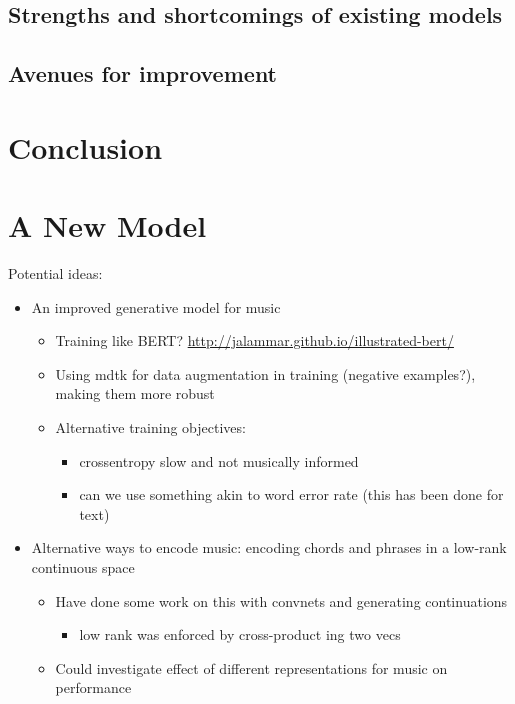 \documentclass[12pt,a4paper,]{report}
\providecommand{\tightlist}{%
  \setlength{\itemsep}{0pt}\setlength{\parskip}{0pt}}
\begin{document}
\hypertarget{strengths-and-shortcomings-of-existing-models}{%
\section{Strengths and shortcomings of existing
models}\label{strengths-and-shortcomings-of-existing-models}}

\hypertarget{avenues-for-improvement}{%
\section{Avenues for improvement}\label{avenues-for-improvement}}

\hypertarget{conclusion}{%
\chapter{Conclusion}\label{conclusion}}

\hypertarget{a-new-model}{%
\chapter{A New Model}\label{a-new-model}}

Potential ideas:

\begin{itemize}
\tightlist
\item
  An improved generative model for music

  \begin{itemize}
  \tightlist
  \item
    Training like BERT?
    \url{http://jalammar.github.io/illustrated-bert/}
  \item
    Using mdtk for data augmentation in training (negative examples?),
    making them more robust
  \item
    Alternative training objectives:

    \begin{itemize}
    \tightlist
    \item
      crossentropy slow and not musically informed
    \item
      can we use something akin to word error rate (this has been done
      for text)
    \end{itemize}
  \end{itemize}
\item
  Alternative ways to encode music: encoding chords and phrases in a
  low-rank continuous space

  \begin{itemize}
  \tightlist
  \item
    Have done some work on this with convnets and generating
    continuations

    \begin{itemize}
    \tightlist
    \item
      low rank was enforced by cross-product ing two vecs
    \end{itemize}
  \item
    Could investigate effect of different representations for music on
    performance
  \end{itemize}
\end{itemize}
\end{document}
